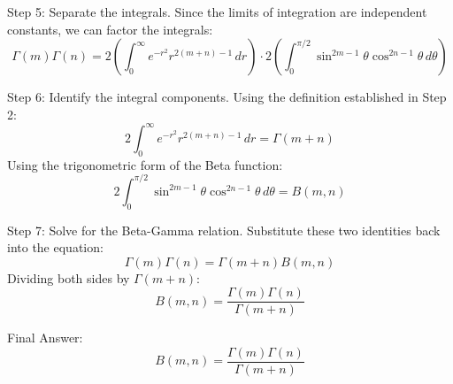\documentclass{article}
\begin{document}
Step 5: Separate the integrals.
Since the limits of integration are independent constants, we can factor the integrals:
\[
\Gamma(m) \Gamma(n) = 2 \left( \int_0^\infty e^{-r^2} r^{2(m+n)-1} \, dr \right) \cdot 2 \left( \int_0^{\pi/2} \sin^{2m-1} \theta \cos^{2n-1} \theta \, d\theta \right)
\]

Step 6: Identify the integral components.
Using the definition established in Step 2:
\[
2 \int_0^\infty e^{-r^2} r^{2(m+n)-1} \, dr = \Gamma(m+n)
\]
Using the trigonometric form of the Beta function:
\[
2 \int_0^{\pi/2} \sin^{2m-1} \theta \cos^{2n-1} \theta \, d\theta = B(m, n)
\]

Step 7: Solve for the Beta-Gamma relation.
Substitute these two identities back into the equation:
\[
\Gamma(m) \Gamma(n) = \Gamma(m+n) B(m, n)
\]
Dividing both sides by $\Gamma(m+n)$:
\[
B(m, n) = \frac{\Gamma(m) \Gamma(n)}{\Gamma(m+n)}
\]

Final Answer:
\[
\boxed{B(m, n) = \frac{\Gamma(m) \Gamma(n)}{\Gamma(m+n)}}
\]
\end{document}
